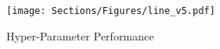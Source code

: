         
        
        


    \begin{figure}[t]
        \centering
        \texttt{[image: Sections/Figures/line\_v5.pdf]}
        \vspace{-2em}
        \caption{Hyper-Parameter Performance}
    \label{fig:line_chart}
    \end{figure}
